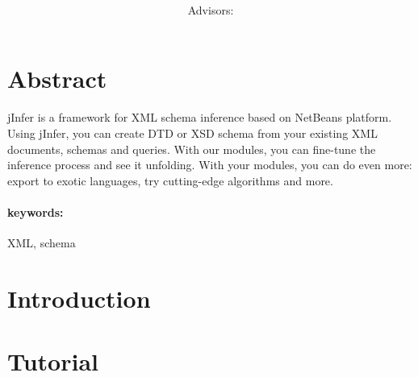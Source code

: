 \documentclass[a4paper,10pt,oneside,twocolumn]{article}
\title{\bf\mftitle}
\author{\mfauthor \\ Advisors: \mfadvisor}
\date{\mfplacedate}
\begin{document}
\maketitle

\section*{Abstract}

jInfer is a framework for XML schema inference based on NetBeans platform.
Using jInfer, you can create DTD or XSD schema from your existing XML documents, schemas and queries.
With our modules, you can fine-tune the inference process and see it unfolding.
With your modules, you can do even more: export to exotic languages, try cutting-edge algorithms and more. 

\paragraph{keywords:} XML, schema


\section*{Introduction}

\section*{Tutorial}

\nocite{*}


\end{document}
